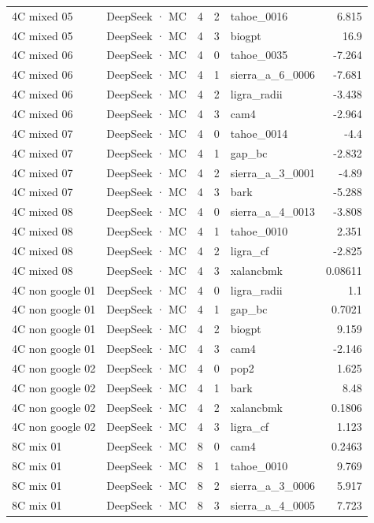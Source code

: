 \begin{tabular}{llrrlr}
4C mixed 05 & DeepSeek · MC & 4 & 2 & tahoe\_0016 & 6.815 \\
4C mixed 05 & DeepSeek · MC & 4 & 3 & biogpt & 16.9 \\
4C mixed 06 & DeepSeek · MC & 4 & 0 & tahoe\_0035 & -7.264 \\
4C mixed 06 & DeepSeek · MC & 4 & 1 & sierra\_a\_6\_0006 & -7.681 \\
4C mixed 06 & DeepSeek · MC & 4 & 2 & ligra\_radii & -3.438 \\
4C mixed 06 & DeepSeek · MC & 4 & 3 & cam4 & -2.964 \\
4C mixed 07 & DeepSeek · MC & 4 & 0 & tahoe\_0014 & -4.4 \\
4C mixed 07 & DeepSeek · MC & 4 & 1 & gap\_bc & -2.832 \\
4C mixed 07 & DeepSeek · MC & 4 & 2 & sierra\_a\_3\_0001 & -4.89 \\
4C mixed 07 & DeepSeek · MC & 4 & 3 & bark & -5.288 \\
4C mixed 08 & DeepSeek · MC & 4 & 0 & sierra\_a\_4\_0013 & -3.808 \\
4C mixed 08 & DeepSeek · MC & 4 & 1 & tahoe\_0010 & 2.351 \\
4C mixed 08 & DeepSeek · MC & 4 & 2 & ligra\_cf & -2.825 \\
4C mixed 08 & DeepSeek · MC & 4 & 3 & xalancbmk & 0.08611 \\
4C non google 01 & DeepSeek · MC & 4 & 0 & ligra\_radii & 1.1 \\
4C non google 01 & DeepSeek · MC & 4 & 1 & gap\_bc & 0.7021 \\
4C non google 01 & DeepSeek · MC & 4 & 2 & biogpt & 9.159 \\
4C non google 01 & DeepSeek · MC & 4 & 3 & cam4 & -2.146 \\
4C non google 02 & DeepSeek · MC & 4 & 0 & pop2 & 1.625 \\
4C non google 02 & DeepSeek · MC & 4 & 1 & bark & 8.48 \\
4C non google 02 & DeepSeek · MC & 4 & 2 & xalancbmk & 0.1806 \\
4C non google 02 & DeepSeek · MC & 4 & 3 & ligra\_cf & 1.123 \\
8C mix 01 & DeepSeek · MC & 8 & 0 & cam4 & 0.2463 \\
8C mix 01 & DeepSeek · MC & 8 & 1 & tahoe\_0010 & 9.769 \\
8C mix 01 & DeepSeek · MC & 8 & 2 & sierra\_a\_3\_0006 & 5.917 \\
8C mix 01 & DeepSeek · MC & 8 & 3 & sierra\_a\_4\_0005 & 7.723 \\

\end{tabular}
